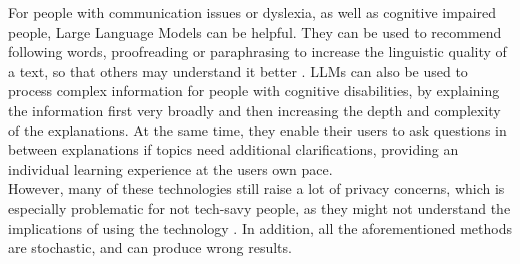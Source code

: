 \documentclass{Academic}
\begin{document}
    For people with communication issues or dyslexia, as well as cognitive impaired people, Large Language Models can be helpful. They can be used to recommend following words, proofreading or paraphrasing to increase the linguistic quality of a text, so that others may understand it better \cite{zdravkova_potential_2022}. LLMs can also be used to process complex information for people with cognitive disabilities, by explaining the information first very broadly and then increasing the depth and complexity of the explanations. At the same time, they enable their users to ask questions in between explanations if topics need additional clarifications, providing an individual learning experience at the users own pace.\\
    However, many of these technologies still raise a lot of privacy concerns, which is especially problematic for not tech-savy people, as they might not understand the implications of using the technology \cite{zdravkova_potential_2022}. In addition, all the aforementioned methods are stochastic, and can produce wrong results.
\end{document}
